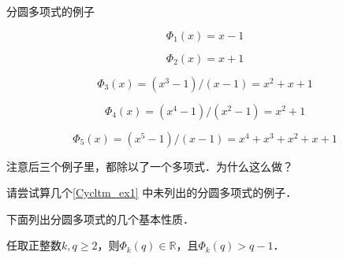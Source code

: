 \begin{example}{分圆多项式的例子}\label{Cycltm_ex1}

\begin{equation}
\Phi_1(x) = x-1
\end{equation}

\begin{equation}
\Phi_2(x) = x+1
\end{equation}

\begin{equation}
\Phi_3(x) = (x^3-1)/(x-1) = x^2+x+1
\end{equation}

\begin{equation}
\Phi_4(x) = (x^4-1)/(x^2-1) = x^2+1
\end{equation}

\begin{equation}
\Phi_5(x) = (x^5-1)/(x-1) = x^4+x^3+x^2+x+1
\end{equation}

注意后三个例子里，都除以了一个多项式．为什么这么做？

\end{example}

\begin{exercise}{}
请尝试算几个\autoref{Cycltm_ex1} 中未列出的分圆多项式的例子．
\end{exercise}

下面列出分圆多项式的几个基本性质．

\begin{theorem}{}
任取正整数$k, q\geq 2$，则$\Phi_k(q)\in\mathbb{R}$，且$\Phi_k(q)>q-1$．
\end{theorem}















